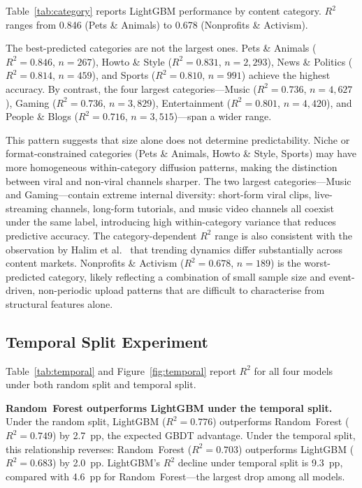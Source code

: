 \documentclass[journal,article,submit,pdftex,moreauthors]{Definitions/mdpi}
\begin{document}
Table~\ref{tab:category} reports LightGBM performance by content category.
$R^2$ ranges from 0.846 (Pets \& Animals) to 0.678 (Nonprofits \&
Activism).

The best-predicted categories are not the largest ones.
Pets \& Animals ($R^2 = 0.846$, $n = 267$), Howto \& Style
($R^2 = 0.831$, $n = 2{,}293$), News \& Politics ($R^2 = 0.814$,
$n = 459$), and Sports ($R^2 = 0.810$, $n = 991$) achieve the highest
accuracy.
By contrast, the four largest categories---Music ($R^2 = 0.736$,
$n = 4{,}627$), Gaming ($R^2 = 0.736$, $n = 3{,}829$), Entertainment
($R^2 = 0.801$, $n = 4{,}420$), and People \& Blogs ($R^2 = 0.716$,
$n = 3{,}515$)---span a wider range.

This pattern suggests that size alone does not determine predictability.
Niche or format-constrained categories (Pets \& Animals, Howto \& Style,
Sports) may have more homogeneous within-category diffusion patterns,
making the distinction between viral and non-viral channels sharper.
The two largest categories---Music and Gaming---contain extreme internal
diversity: short-form viral clips, live-streaming channels, long-form
tutorials, and music video channels all coexist under the same label,
introducing high within-category variance that reduces predictive accuracy.
The category-dependent $R^2$ range is also consistent with the observation
by Halim et al.\ \cite{ref-halim2022} that trending dynamics differ
substantially across content markets.
Nonprofits \& Activism ($R^2 = 0.678$, $n = 189$) is the worst-predicted
category, likely reflecting a combination of small sample size and
event-driven, non-periodic upload patterns that are difficult to
characterise from structural features alone.

\subsection{Temporal Split Experiment}
\label{sec:temporal_split}

Table~\ref{tab:temporal} and Figure~\ref{fig:temporal} report $R^2$
for all four models under both random split and temporal split.

\textbf{Random~Forest outperforms LightGBM under the temporal split.}
Under the random split, LightGBM ($R^2 = 0.776$) outperforms
Random~Forest ($R^2 = 0.749$) by 2.7~pp, the expected GBDT advantage.
Under the temporal split, this relationship reverses:
Random~Forest ($R^2 = 0.703$) outperforms LightGBM ($R^2 = 0.683$)
by 2.0~pp.
LightGBM's $R^2$ decline under temporal split is 9.3~pp, compared with
4.6~pp for Random~Forest---the largest drop among all models.
\end{document}

